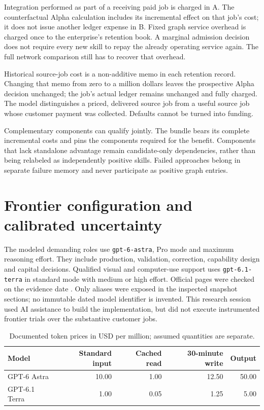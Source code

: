 \documentclass[11pt,letterpaper]{article}
\begin{document}
Integration performed as part of a receiving paid job is charged in A. The
counterfactual Alpha calculation includes its incremental effect on that job's
cost; it does not issue another ledger expense in B. Fixed graph service overhead
is charged once to the enterprise's retention book. A marginal admission decision
does not require every new skill to repay the already operating service again.
The full network comparison still has to recover that overhead.

Historical source-job cost is a non-additive memo in each retention record.
Changing that memo from zero to a million dollars leaves the prospective Alpha
decision unchanged; the job's actual ledger remains unchanged and fully charged.
The model distinguishes a priced, delivered source job from a useful source job
whose customer payment was collected. Defaults cannot be turned into funding.

Complementary components can qualify jointly. The bundle bears its complete
incremental costs and pins the components required for the benefit. Components
that lack standalone advantage remain candidate-only dependencies, rather than
being relabeled as independently positive skills. Failed approaches belong in
separate failure memory and never participate as positive graph entries.

\section{Frontier configuration and calibrated uncertainty}

The modeled demanding roles use \texttt{gpt-6-astra}, Pro mode and maximum
reasoning effort. They include production, validation, correction, capability
design and capital decisions. Qualified visual and computer-use support uses
\texttt{gpt-6.1-terra} in standard mode with medium or high effort. Official pages
were checked on the evidence date \citep{oai-astra,oai-terra,oai-latest,oai-reasoning,oai-terra-release}.
Only aliases were exposed in the inspected snapshot sections; no immutable dated
model identifier is invented. This research session used AI assistance to build
the implementation, but did not execute instrumented frontier trials over the
substantive customer jobs.

\begin{table}[H]\centering\small
\caption{Documented token prices in USD per million; assumed quantities are separate.}
\begin{tabular}{lrrrr}\toprule
Model & Standard input & Cached read & 30-minute write & Output\\\midrule
GPT-6 Astra & 10.00 & 1.00 & 12.50 & 50.00\\
GPT-6.1 Terra & 1.00 & 0.05 & 1.25 & 5.00\\\bottomrule
\end{tabular}
\end{table}
\end{document}
